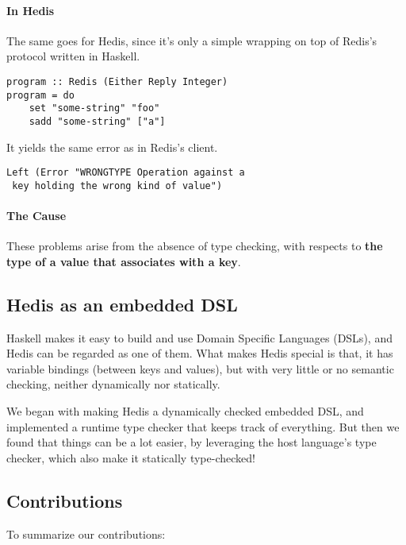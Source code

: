 \documentclass[pldi]{sigplanconf-pldi16}
\begin{document}
\paragraph{In Hedis} The same goes for Hedis, since it's only a simple wrapping
 on top of Redis's protocol written in Haskell.

\begin{verbatim}
program :: Redis (Either Reply Integer)
program = do
    set "some-string" "foo"
    sadd "some-string" ["a"]
\end{verbatim}

It yields the same error as in Redis's client.

\begin{verbatim}
Left (Error "WRONGTYPE Operation against a
 key holding the wrong kind of value")
\end{verbatim}

\paragraph{The Cause} These problems arise from the absence of type checking,
with respects to \textbf{the type of a value that associates with a key}.

\subsection{Hedis as an embedded DSL}

Haskell makes it easy to build and use Domain Specific Languages (DSLs),
and Hedis can be regarded as one of them. What makes Hedis special is that,
it has variable bindings (between keys and values), but with very
little or no semantic checking, neither dynamically nor statically.

We began with making Hedis a dynamically checked embedded DSL, and implemented a
runtime type checker that keeps track of everything. But then we found that
things can be a lot easier, by leveraging the host language's type checker,
which also make it statically type-checked!

\subsection{Contributions}

To summarize our contributions:
\end{document}

